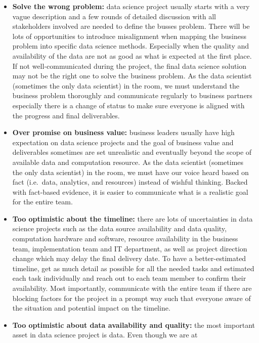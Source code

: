 \documentclass[12pt,]{krantz}
\theoremstyle{definition}
\theoremstyle{definition}
\theoremstyle{definition}
\theoremstyle{remark}
\begin{document}
\begin{itemize}
\item
  \textbf{Solve the wrong problem:} data science project usually starts
  with a very vague description and a few rounds of detailed discussion
  with all stakeholders involved are needed to define the busses
  problem. There will be lots of opportunities to introduce misalignment
  when mapping the business problem into specific data science methods.
  Especially when the quality and availability of the data are not as
  good as what is expected at the first place. If not well-communicated
  during the project, the final data science solution may not be the
  right one to solve the business problem. As the data scientist
  (sometimes the only data scientist) in the room, we must understand
  the business problem thoroughly and communicate regularly to business
  partners especially there is a change of status to make sure everyone
  is aligned with the progress and final deliverables.
\item
  \textbf{Over promise on business value:} business leaders usually have
  high expectation on data science projects and the goal of business
  value and deliverables sometimes are set unrealistic and eventually
  beyond the scope of available data and computation resource. As the
  data scientist (sometimes the only data scientist) in the room, we
  must have our voice heard based on fact (i.e.~data, analytics, and
  resources) instead of wishful thinking. Backed with fact-based
  evidence, it is easier to communicate what is a realistic goal for the
  entire team.
\item
  \textbf{Too optimistic about the timeline:} there are lots of
  uncertainties in data science projects such as the data source
  availability and data quality, computation hardware and software,
  resource availability in the business team, implementation team and IT
  department, as well as project direction change which may delay the
  final delivery date. To have a better-estimated timeline, get as much
  detail as possible for all the needed tasks and estimated each task
  individually and reach out to each team member to confirm their
  availability. Most importantly, communicate with the entire team if
  there are blocking factors for the project in a prompt way such that
  everyone aware of the situation and potential impact on the timeline.
\item
  \textbf{Too optimistic about data availability and quality:} the most
  important asset in data science project is data. Even though we are at

\end{itemize}
\end{document}
